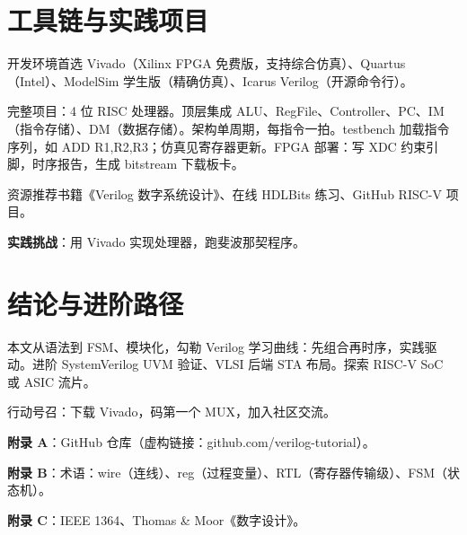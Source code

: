 \chapter{工具链与实践项目}
开发环境首选 Vivado（Xilinx FPGA 免费版，支持综合仿真）、Quartus（Intel）、ModelSim 学生版（精确仿真）、Icarus Verilog（开源命令行）。\par
完整项目：4 位 RISC 处理器。顶层集成 ALU、RegFile、Controller、PC、IM（指令存储）、DM（数据存储）。架构单周期，每指令一拍。testbench 加载指令序列，如 ADD R1,R2,R3；仿真见寄存器更新。FPGA 部署：写 XDC 约束引脚，时序报告，生成 bitstream 下载板卡。\par
资源推荐书籍《Verilog 数字系统设计》、在线 HDLBits 练习、GitHub RISC-V 项目。\par
\textbf{实践挑战}：用 Vivado 实现处理器，跑斐波那契程序。\par
\chapter{结论与进阶路径}
本文从语法到 FSM、模块化，勾勒 Verilog 学习曲线：先组合再时序，实践驱动。进阶 SystemVerilog UVM 验证、VLSI 后端 STA 布局。探索 RISC-V SoC 或 ASIC 流片。\par
行动号召：下载 Vivado，码第一个 MUX，加入社区交流。\par
\textbf{附录 A}：GitHub 仓库（虚构链接：github.com/verilog-tutorial）。\par
\textbf{附录 B}：术语：wire（连线）、reg（过程变量）、RTL（寄存器传输级）、FSM（状态机）。\par
\textbf{附录 C}：IEEE 1364、Thomas \&{} Moor《数字设计》。\par
